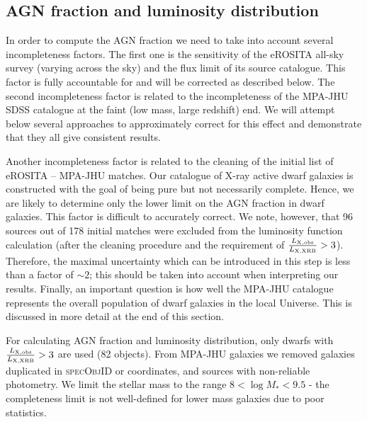 \documentclass[fleqn,usenatbib]{mnras}
\newcommand{\lxlxrbrat}{\frac{L_{\rm X, obs}}{L_{\rm X, XRB}}}
\newcommand{\mg}[1]{\textcolor{blue}{{MG: \bf||#1||}}}
\begin{document}
\subsection{AGN fraction and luminosity distribution}
\label{sect:results:optical:fraction}


In order to compute the AGN fraction we need to take into account several incompleteness factors. The first one is the  sensitivity of the  eROSITA all-sky survey (varying across the sky) and the flux limit of its source catalogue. This factor is fully accountable for and will be corrected as described below. The second incompleteness factor is related to the incompleteness of the MPA-JHU SDSS catalogue at the faint (low mass, large redshift) end.  We will attempt below several approaches to approximately correct for this effect and demonstrate that they all give consistent results.

Another incompleteness factor is related to the cleaning of the initial list of eROSITA -- MPA-JHU matches.  
Our catalogue of X-ray active dwarf galaxies is constructed with the goal of being pure but not necessarily  complete.
Hence, we are likely to determine only the lower limit on the AGN fraction in dwarf galaxies. This factor is difficult to accurately correct. We note, however, that  96 sources out of 178 initial matches were excluded from the luminosity function calculation (after the cleaning procedure and the requirement of $\lxlxrbrat>3$). Therefore, the maximal uncertainty which can be introduced in this step is less than a factor of $\sim 2$; this should be taken into account when interpreting our results. Finally, an important question is how well  the MPA-JHU catalogue  represents the overall population of dwarf galaxies in the local Universe. This is discussed in more detail at the end of this section.

For calculating AGN fraction and luminosity distribution, only dwarfs with $\lxlxrbrat>3$ are used (82 objects). From MPA-JHU galaxies we removed galaxies duplicated in \textsc{specObjID} or coordinates, and sources with non-reliable photometry.  We limit the stellar mass to the range $8<\log{M_*}<9.5$ - the completeness limit is not well-defined for lower mass galaxies due to poor statistics.

\end{document}
